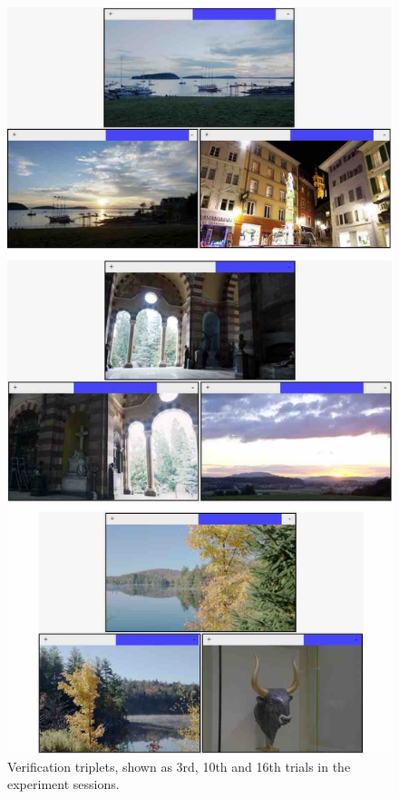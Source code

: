 \begin{figure}
\begin{center}
\includegraphics[height=0.85\textheight]{figures/chapter3/verification_small.jpg}
\caption{Verification triplets, shown as 3rd, 10th and 16th trials in the experiment sessions. }
\label{fig:verficiation}
\end{center}
\end{figure}

